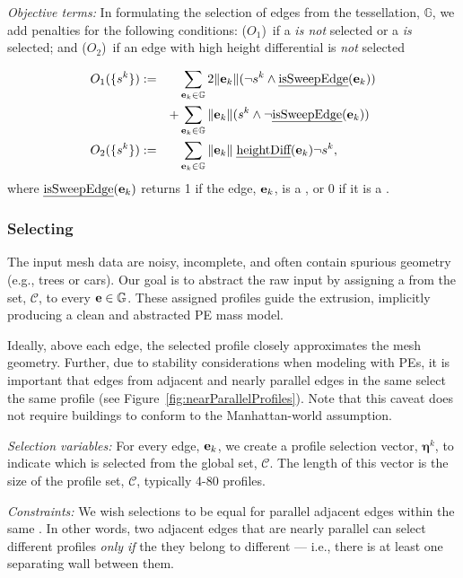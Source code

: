 {\noindent \em Objective terms:} 
In formulating the selection of edges from the tessellation, $\mathbb{G}$, we add penalties for the following conditions: 
($O_1$)~if a \sweepedge \emph{is not} selected or a \softedge \emph{is} selected; and 
($O_2$)~if an edge with high height differential is {\em not} selected

\begin{align*}
O_1( \{s^k\} ) &:=& 
  &\sum_{\mathbf{e}_k \in \mathbb{G}} 2 \|\mathbf{e}_k\| (\neg s^k \land \text{\emph{isSweepEdge}}(\mathbf{e}_k)) \nonumber \\ 
&&+ &\sum_{\mathbf{e}_k \in \mathbb{G}}
\|\mathbf{e}_k\| (s^k \land \neg \text{\emph{isSweepEdge}}(\mathbf{e}_k)) \nonumber \\ 
O_2( \{s^k\} ) &:=& &\sum_{\mathbf{e}_k \in \mathbb{G}}  \|\mathbf{e}_k\|  \; \text{\emph{heightDiff}}(\mathbf{e}_k) \neg s{}^k,  \nonumber
\end{align*}
where  
$\text{\emph{isSweepEdge}}(\mathbf{e}_k)$ returns 1 if the edge, $\mathbf{e}_k$, is a \sweepedge, or 0 if it is a \softedge.

\subsubsection{Selecting \cleanprofiles} 
%
The input mesh data are noisy, incomplete, and often contain spurious geometry (e.g., trees or cars). Our goal is to abstract the raw input by assigning a \cleanprofile from the set, $\mathcal{C}$, to every $\mathbf{e} \in \mathbb{G}$. These assigned profiles guide the \footprintpolygon extrusion, implicitly producing a clean and abstracted PE mass model. 

Ideally, above each edge, the selected profile closely approximates the mesh geometry. Further, due to stability considerations when modeling with PEs, it is important that edges from adjacent and nearly parallel edges in the same \footprintpolygon select the same profile (see Figure~\ref{fig:nearParallelProfiles}). Note that this caveat does not require buildings to conform to the Manhattan-world assumption.



{\noindent \em Selection variables:} 
For every edge, $\mathbf{e}_k$, we create a profile selection vector, $\mathbold{\eta}^k$, to indicate which \cleanprofile is selected from the global set, $\mathcal{C}$. The length of this vector is the size of the profile set, $\mathcal{C}$, typically 4-80 profiles.


{\noindent \em Constraints:} 
We wish \cleanprofile selections to be equal for parallel adjacent edges within the same \footprintpolygon. In other words, two adjacent edges that are nearly parallel can select different profiles {\em only if} the they belong to different \footprintpolygons --- i.e., there is at least one separating wall between them. 

